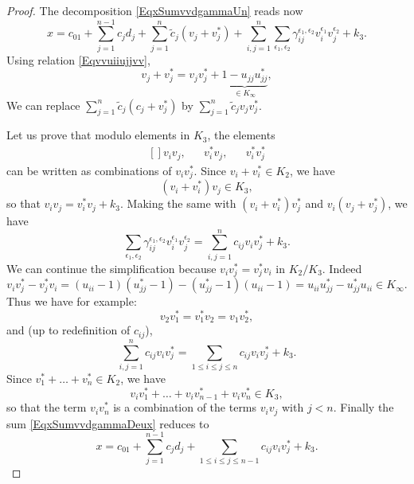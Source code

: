 \begin{proof}
    The decomposition \eqref{EqxSumvvdgammaUn} reads now
    \begin{equation}        \label{EqxSumvvdgammaDeux}
        x=c_01+\sum_{j=1}^{n-1}c_jd_j+\sum_{j=1}^n\tilde c_j(v_j+v_j^*)+\sum_{i,j=1}^n\sum_{\epsilon_1,\epsilon_2}\gamma_{ij}^{\epsilon_1,\epsilon_2}v_i^{\epsilon_1}v_j^{\epsilon_2}+k_3.
    \end{equation}
    Using relation \eqref{Eqvvuiiujjvv},
    \begin{equation}
        v_j+v_j^*=v_jv_j^*+\underbrace{1-u_{jj}u_{jj}^*}_{\in K_{\infty}},
    \end{equation}
    We can replace $\sum_{j=1}^n\tilde c_j(c_j+v_j^*)$ by $\sum_{j=1}^n\tilde c_jv_jv_j^*$.

    Let us prove that modulo elements in $K_3$, the elements
    \begin{equation}
        \begin{aligned}[]
            v_iv_j,&&v_i^*v_j,&&v_i^*v_j^*
        \end{aligned}
    \end{equation}
    can be written as combinations of $v_iv_j^*$. Since $v_i+v_i^*\in K_2$, we have
    \begin{equation}
        (v_i+v_i^*)v_j\in K_3,
    \end{equation}
    so that $v_iv_j=v_i^*v_j+k_3$. Making the same with $(v_i+v_i^*)v_j^*$ and $v_i(v_j+v_j^*)$, we have
    \begin{equation}
        \sum_{\epsilon_1,\epsilon_2}\gamma_{ij}^{\epsilon_1,\epsilon_2}v_i^{\epsilon_1}v_j^{\epsilon_2}=\sum_{i,j=1}^nc_{ij}v_iv_j^*+k_3.
    \end{equation}
    We can continue the simplification because $v_iv_j^*=v_j^*v_i$ in $K_2/K_3$. Indeed
    \begin{equation}
        v_iv_j^*-v_j^*v_i=(u_{ii}-1)(u_{jj}^*-1)-(u_{jj}^*-1)(u_{ii}-1)=u_{ii}u_{jj}^*-u_{jj}^*u_{ii}\in K_{\infty}.
    \end{equation}
    Thus we have for example:
    \begin{equation}
        v_2v_1^*=v_1^*v_2=v_1v_2^*,
    \end{equation}
    and (up to redefinition of $c_{ij}$),
    \begin{equation}
        \sum_{i,j=1}^nc_{ij}v_iv_j^*=\sum_{1\leq i\leq j\leq n}c_{ij}v_iv_j^*+k_3.
    \end{equation}
    Since $v^*_1+\ldots+v^*_n\in K_2$, we have
    \begin{equation}
        v_iv_1^*+\ldots+v_iv^*_{n-1}+v_iv^*_n\in K_3,
    \end{equation}
    so that the term $v_iv^*_n$ is a combination of the terms $v_iv_j$ with $j<n$. Finally the sum \eqref{EqxSumvvdgammaDeux} reduces to
    \begin{equation}
        x=c_01+\sum_{j=1}^{n-1}c_jd_j+\sum_{1\leq i\leq j\leq n-1}c_{ij}v_iv_j^*+k_3.
    \end{equation}
\end{proof}



